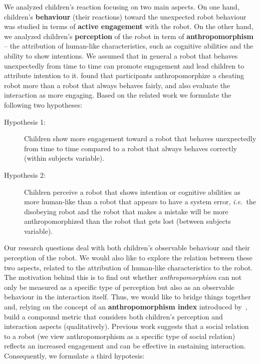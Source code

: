\documentclass{sig-alternate}
\newcommand{\ie}{{\textit{i.e.~}}}
\begin{document}
We analyzed children's reaction focusing on two main aspects. On one hand,
children's \textbf{behaviour} (their reactions) toward the unexpected robot
behaviour was studied in terms of \textbf{active engagement} with the robot. On
the other hand, we analyzed children's \textbf{perception} of the robot in term
of \textbf{anthropomorphism} -- the attribution of human-like characteristics,
such as cognitive abilities and the ability to show intentions. We assumed that
in general a robot that behaves unexpectedly from time to time can promote
engagement and lead children to attribute intention to it. \cite{short_no_2010}
found that participants anthropomorphize a cheating robot more than a robot that
always behaves fairly, and also evaluate the interaction as more engaging. Based
on the related work we formulate the following two hypotheses:

\begin{description}

    \item[Hypothesis 1:] Children show more engagement toward a robot that
        behaves unexpectedly from time to time compared to a robot that always
        behaves correctly (within subjects variable).

    \item[Hypothesis 2:] Children perceive a robot that shows intention or
        cognitive abilities as more human-like than a robot that appears to have
        a system error, \ie the disobeying robot and the robot that makes a
        mistake will be more anthropomorphized than the robot that gets lost
        (between subjects variable).

\end{description}

Our research questions deal with both children's observable behaviour and their
perception of the robot. We would also like to explore the relation between
these two aspects, related to the attribution of human-like characteristics to
the robot. The motivation behind this is to find out whether
\textit{anthropomorphism} can not only be measured as a specific type of
perception but also as an observable behaviour in the interaction itself. Thus,
we would like to bridge things together and, relying on the concept of an
\textbf{anthropomorphism index} introduced by~\cite{fink2014dynamics}, build a
compound metric that considers both children's perception and interaction
aspects (qualitatively). Previous work suggests that a social relation to a
robot (we view anthropomorphism as a specific type of social relation) reflects
an increased engagement and can be effective in sustaining interaction.
Consequently, we formulate a third hypotesis:
\end{document}

